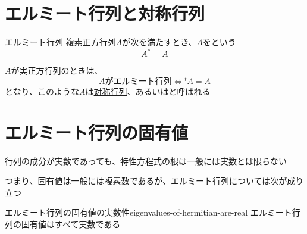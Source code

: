 \documentclass[../../../topic_linear-algebra]{subfiles}
\begin{document}
\sectionline
\section{エルミート行列と対称行列}

\begin{definition}{エルミート行列}
  複素正方行列$A$が次を満たすとき、$A$をという
  \begin{equation*}
    A^* = A
  \end{equation*}
\end{definition}

$A$が実正方行列のときは、
\begin{equation*}
  A\text{がエルミート行列} \Longleftrightarrow {}^tA = A
\end{equation*}
となり、このような$A$は\hyperref[def:symmetric-matrix]{対称行列}、あるいはと呼ばれる

\sectionline
\section{エルミート行列の固有値}

行列の成分が実数であっても、特性方程式の根は一般には実数とは限らない

つまり、固有値は一般には複素数であるが、エルミート行列については次が成り立つ

\begin{theorem}{エルミート行列の固有値の実数性}{eigenvalues-of-hermitian-are-real}
  エルミート行列の固有値はすべて実数である
\end{theorem}
\end{document}

